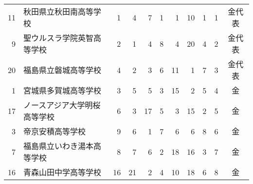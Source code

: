 \documentclass[11pt,a4paper,landscape,twoside,openany,english,uplatex]{jsarticle}
\begin{document}
\begin{table}[h]
\begin{tabular}{r|l|rrrrrrr|r|c}

  11 & 秋田県立秋田南高等学校       &  1    &  4    &  7    &  1    &  1    & 10    &  1 &  1 & 金代表 \\
   9 & 聖ウルスラ学院英智高等学校   &  2    &  1    &  4    &  8    &  4    & 20    &  4 &  2 & 金代表 \\
  20 & 福島県立磐城高等学校         &  4    &  2    &  3    &  6    & 11    &  1    &  7 &  3 & 金代表 \\
   1 & 宮城県多賀城高等学校         &  3    &  5    &  5    &  3    & 15    &  2    &  5 &  4 & 金 \\
  17 & ノースアジア大学明桜高等学校 &  6    &  3    & 17    &  5    &  3    & 15    &  2 &  5 & 金 \\
   3 & 帝京安積高等学校             &  9    &  6    &  1    &  7    &  6    &  6    &  8 &  6 & 金 \\
   7 & 福島県立いわき湯本高等学校   &  8    &  7    &  6    &  2    & 18    & 16    &  3 &  7 & 金 \\
  16 & 青森山田中学高等学校         & 16    & 21    &  2    &  4    & 10    & 18    &  6 &  8 & 金 \\
  \hline


\end{tabular}
\end{table}
\end{document}
